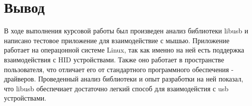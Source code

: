 \documentclass[14pt,a4paper]{article}
\begin{document}
\section{Вывод}
    В ходе выполнения курсовой работы был произведен анализ библиотеки libusb и написано тестовое приложение для взаимодействие с мышью. Приложение работает на операцонной системе Linux, так как именно на ней есть поддержка взаимодействия с HID устройствами. Также оно работает в пространстве пользователя, что отличает его от стандартного программного обеспечения - драйверов. Проведенный анализ библиотеки и опыт разработки на ней показал, что libusb обеспечиает достаточно легкий способ для взаимодейстия с usb устройствами.
\end{document}
